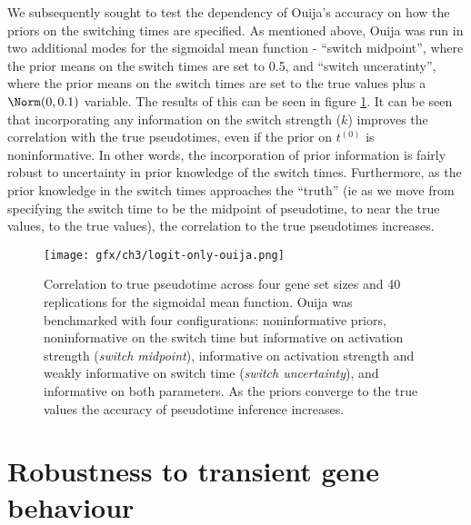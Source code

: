 We subsequently sought to test the dependency of Ouija's accuracy on how the priors on the switching times are specified. As mentioned above, Ouija was run in two additional modes for the sigmoidal mean function - ``switch midpoint'', where the prior means on the switch times are set to 0.5, and ``switch unceratinty'', where the prior means on the switch times are set to the true values plus a $\Norm(0, 0.1)$ variable. The results of this can be seen in figure \ref{fig:ouija_only}. It can be seen that incorporating any information on the switch strength ($k$) improves the correlation with the true pseudotimes, even if the prior on $t^{(0)}$ is noninformative. In other words, the incorporation of prior information is fairly robust to uncertainty in prior knowledge of the switch times. Furthermore, as the prior knowledge in the switch times approaches the ``truth'' (ie as we move from specifying the switch time to be the midpoint of pseudotime, to near the true values, to the true values), the correlation to the true pseudotimes increases.


\begin{figure}%
	\centering
	\texttt{[image: gfx/ch3/logit-only-ouija.png]}
	\caption{Correlation to true pseudotime across four gene set sizes and 40 replications for the sigmoidal mean function. Ouija was benchmarked with four configurations: noninformative priors, noninformative on the switch time but informative on activation strength (\emph{switch midpoint}), informative on activation strength and weakly informative on switch time (\emph{switch uncertainty}), and informative on both parameters. As the priors converge to the true values the accuracy of pseudotime inference increases.}
	\label{fig:ouija_only}
\end{figure}

\section{Robustness to transient gene behaviour}

